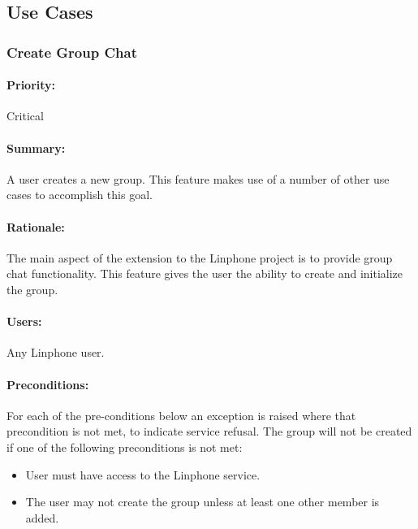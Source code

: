\documentclass[11pt]{article}
\begin{document}

\subsection{Use Cases}
\subsubsection{Create Group Chat} \label{UC-create-group}
\paragraph{Priority:}Critical
\paragraph{Summary:} A user creates a new group. This feature makes use of a number of other use cases to accomplish this goal.
\paragraph{Rationale:} The main aspect of the extension to the Linphone project is to provide group chat functionality. This feature gives the user the ability to create and initialize the group.
\paragraph{Users:}  Any Linphone user.
\paragraph{Preconditions:}For each of the pre-conditions below an exception is raised where that precondition is not met, to indicate service refusal.
The group will not be created if one of the following preconditions is not met:
\begin{itemize}
\item	User must have access to the Linphone service.
\item	The user may not create the group unless at least one other member is added.
\end{itemize}
\end{document}
